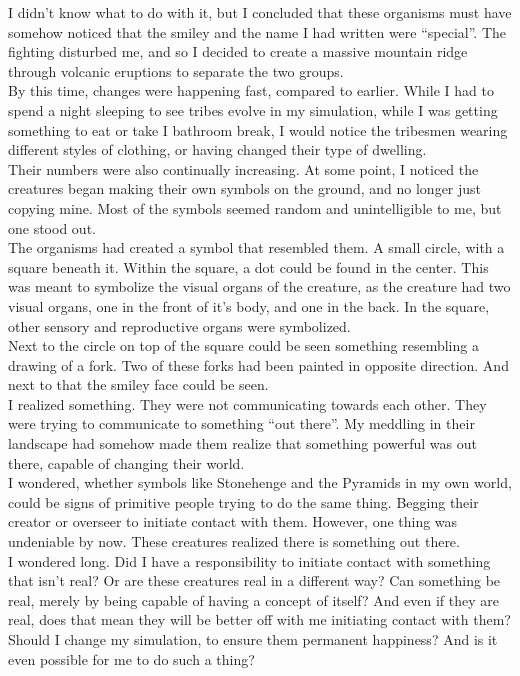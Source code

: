 \documentclass[a5paper]{scrartcl}
\begin{document}
I didn't know what to do with it, but I concluded that these organisms must have somehow noticed that the smiley and the name I had written were \enquote{special}. The fighting disturbed me, and so I decided to create a massive mountain ridge through volcanic eruptions to separate the two groups.\\


By this time, changes were happening fast, compared to earlier. While I had to spend a night sleeping to see tribes evolve in my simulation, while I was getting something to eat or take I bathroom break, I would notice the tribesmen wearing different styles of clothing, or having changed their type of dwelling.\\


Their numbers were also continually increasing. At some point, I noticed the creatures began making their own symbols on the ground, and no longer just copying mine. Most of the symbols seemed random and unintelligible to me, but one stood out.\\


The organisms had created a symbol that resembled them. A small circle, with a square beneath it. Within the square, a dot could be found in the center. This was meant to symbolize the visual organs of the creature, as the creature had two visual organs, one in the front of it's body, and one in the back. In the square, other sensory and reproductive organs were symbolized.\\


Next to the circle on top of the square could be seen something resembling a drawing of a fork. Two of these forks had been painted in opposite direction. And next to that the smiley face could be seen.\\


I realized something. They were not communicating towards each other. They were trying to communicate to something \enquote{out there}. My meddling in their landscape had somehow made them realize that something powerful was out there, capable of changing their world.\\


I wondered, whether symbols like Stonehenge and the Pyramids in my own world, could be signs of primitive people trying to do the same thing. Begging their creator or overseer to initiate contact with them. However, one thing was undeniable by now. These creatures realized there is something out there.\\


I wondered long. Did I have a responsibility to initiate contact with something that isn't real? Or are these creatures real in a different way? Can something be real, merely by being capable of having a concept of itself? And even if they are real, does that mean they will be better off with me initiating contact with them? Should I change my simulation, to ensure them permanent happiness? And is it even possible for me to do such a thing?\\
\end{document}
